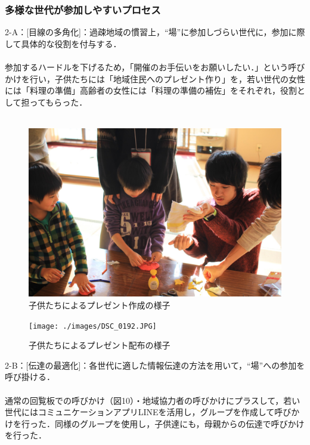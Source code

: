 \documentclass[a4paper]{jsarticle}
\begin{document}
\subsubsection{多様な世代が参加しやすいプロセス}
2-A：[目線の多角化]：過疎地域の慣習上，“場”に参加しづらい世代に，参加に際して具体的な役割を付与する．\\\\
参加するハードルを下げるため，「開催のお手伝いをお願いしたい．」という呼びかけを行い，子供たちには「地域住民へのプレゼント作り」を，若い世代の女性には「料理の準備」高齢者の女性には「料理の準備の補佐」をそれぞれ，役割として担ってもらった．\\\\
\begin{figure}[H]
  \begin{center}
    \includegraphics[width=0.95\hsize]{./images/IMG_5929.JPG}
    \caption{子供たちによるプレゼント作成の様子}
    \label{chirstmas2}
  \end{center}
\end{figure}
\begin{figure}[H]
  \begin{center}
    \texttt{[image: ./images/DSC\_0192.JPG]}
    \caption{子供たちによるプレゼント配布の様子}
    \label{chirstmas2}
  \end{center}
\end{figure}

2-B：[伝達の最適化]：各世代に適した情報伝達の方法を用いて，“場”への参加を呼び掛ける．\\\\
通常の回覧板での呼びかけ（図10）・地域協力者の呼びかけにプラスして，若い世代にはコミュニケーションアプリLINEを活用し，グループを作成して呼びかけを行った．同様のグループを使用し，子供達にも，母親からの伝達で呼びかけを行った．
\end{document}
